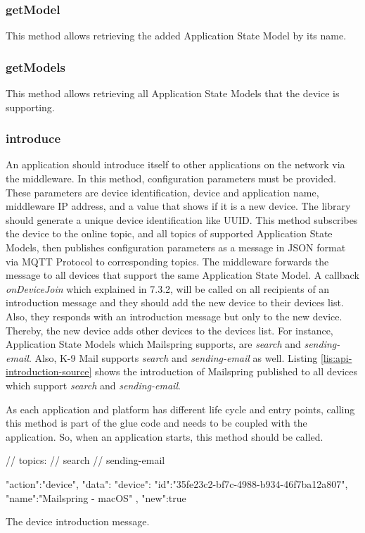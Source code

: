 \subsubsection{getModel}
This method allows retrieving the added Application State Model by its name.

\subsubsection{getModels}
This method allows retrieving all Application State Models that the device is supporting. 

\subsubsection{introduce}
An application should introduce itself to other applications on the network via the middleware. In this method, configuration parameters must be provided. These parameters are device identification, device and application name, middleware IP address, and a value that shows if it is a new device. The library should generate a unique device identification like UUID. This method subscribes the device to the online topic, and all topics of supported Application State Models, then publishes configuration parameters as a message in JSON format via MQTT Protocol to corresponding topics. The middleware forwards the message to all devices that support the same Application State Model. A callback \textit{onDeviceJoin} which explained in 7.3.2, will be called on all recipients of an introduction message and they should add the new device to their devices list. Also, they responds with an introduction message but only to the new device. Thereby, the new device adds other devices to the devices list. For instance, Application State Models which Mailspring supports, are \textit{search} and \textit{sending-email}. Also, K-9 Mail supports \textit{search} and \textit{sending-email} as well. Listing \ref{lis:api-introduction-source} shows the introduction of Mailspring published to all devices which support \textit{search} and \textit{sending-email}.

As each application and platform has different life cycle and entry points, calling this method is part of the glue code and needs to be coupled with the application. So, when an application starts, this method should be called.

\FloatBarrier
\begin{code}
\begin{js2}
// topics:
// search
// sending-email
\end{js2}
\begin{json}
{
   "action":"device",
   "data":{
      "device":{
         "id":"35fe23c2-bf7c-4988-b934-46f7ba12a807",
         "name":"Mailspring - macOS"
      },
      "new":true
   }
}
\end{json}
\caption{The device introduction message.}
\label{lis:api-introduction-source}
\end{code}
\FloatBarrier


